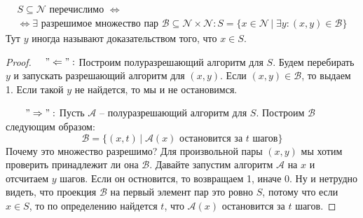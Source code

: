 \begin{theorem}
    \begin{gather*} S \subseteq \mathcal{N} \text{ перечислимо } \Longleftrightarrow \\
        \Longleftrightarrow \exists  \text{ разрешимое множество пар } \mathcal{B} \subseteq \mathcal{N} \times \mathcal{N} : S = \{ x \in \mathcal{N} \, | \; \exists y : (x, y) \in \mathcal{B} \} \end{gather*}
    Тут $y$ иногда называют доказательством того, что $x \in S$.
\end{theorem}
\begin{proof}
    \quad 

    \quad $\quad"\Leftarrow":$ Построим полуразрешающий алгоритм для $S$. Будем перебирать $y$ и запускать разрешающий алгоритм для $(x, y)$. Если $(x, y) \in \mathcal{B}$, то выдаем 1. Если такой $y$ не найдется, то мы и не остановимся.

    $\quad\quad "\Rightarrow":$ Пусть $\mathcal{A}$ -- полуразрешающий алгоритм для $S$. Построим $\mathcal{B}$ следующим образом: \[ \mathcal{B} = \{ (x, t) \, | \; \mathcal{A}(x) \text{ остановится за $t$ шагов}  \} \]
    \quad Почему это множество разрешимо? Для произвольной пары $(x, y)$ мы хотим проверить принадлежит ли она $\mathcal{B}$. Давайте запустим алгоритм $\mathcal{A}$ на $x$ и отсчитаем $y$ шагов. Если он остновится, то возвращаем 1, иначе 0. Ну и нетрудно видеть, что проекция $\mathcal{B}$ на первый элемент пар это ровно $S$, потому что если $x \in S$, то по определению найдется $t$, что $\mathcal{A}(x)$ остановится за $t$ шагов.
 
\end{proof}
